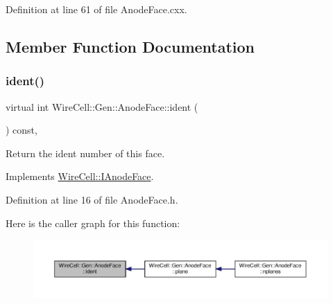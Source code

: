 Definition at line 61 of file Anode\+Face.\+cxx.



\subsection{Member Function Documentation}
\mbox{\label{class_wire_cell_1_1_gen_1_1_anode_face_a57abc0570f11b050da061e694507b17d}} 
\subsubsection{\texorpdfstring{ident()}{ident()}}
{\footnotesize\ttfamily virtual int Wire\+Cell\+::\+Gen\+::\+Anode\+Face\+::ident (\begin{DoxyParamCaption}{ }\end{DoxyParamCaption}) const\hspace{0.3cm}{\ttfamily [inline]}, {\ttfamily [virtual]}}



Return the ident number of this face. 



Implements \hyperlink{class_wire_cell_1_1_i_anode_face_a2090bdf3aac37747dcc831ce1529bf53}{Wire\+Cell\+::\+I\+Anode\+Face}.



Definition at line 16 of file Anode\+Face.\+h.

Here is the caller graph for this function\+:
\nopagebreak
\begin{figure}[H]
\begin{center}
\leavevmode
\includegraphics[width=350pt]{class_wire_cell_1_1_gen_1_1_anode_face_a57abc0570f11b050da061e694507b17d_icgraph}
\end{center}
\end{figure}
\mbox{\label{class_wire_cell_1_1_gen_1_1_anode_face_aa4becde47c5ca6e98a08674a61b33b72}} 
